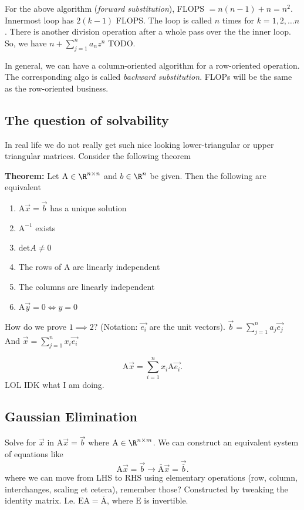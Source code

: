 \documentclass[a4paper]{article}
\begin{document}


For the above algorithm (\emph{forward substitution}), FLOPS $= n(n-1) + n = n^2$.
Innermost loop has $2(k-1)$ FLOPS. The loop is called $n$ times for
$k = 1,2,\ldots n$. There is another division operation after a whole
pass over the the inner loop. So, we have $n + \sum_{j=1}^{n} a_n z^n$ TODO. %

In general, we can have a column-oriented algorithm for a row-oriented
operation. The corresponding algo is called \emph{backward substitution}. 
FLOPs will be the same as the row-oriented business.

\subsection*{The question of solvability}
In real life we do not really get such nice looking lower-triangular
or upper triangular matrices. Consider the following theorem

\textbf{Theorem:} Let $\mathrm A \in \R^{n\times n}$ and $b \in  \R^{n}$ be given. Then the following are equivalent
\begin{enumerate}
	\item $\mathrm A \vec{x}= \vec{b}$ has a unique solution
	\item $\mathrm A^{-1}$ exists
	\item $\text{det} A \neq 0$ 
	\item The rows of $\mathrm A$ are linearly independent
	\item The columns are linearly independent
	\item $\mathrm A\vec{y} = 0 \iff y = 0$
\end{enumerate}
How do we prove $1 \implies 2$? (Notation: $\vec{e_i}$ are the unit vectors).
$\vec{b} = \sum_{j=1}^{n} a_j\vec{e_j}$ And $\vec{x} = \sum_{j=1}^{n} x_i \vec{e_i}$

\[
	\mathrm A \vec{x} = \sum_{i=1}^{n} x_i \mathrm{A}\vec{e_i}
.\] 
LOL IDK what I am doing. %

\subsection*{Gaussian Elimination}
Solve for $\vec{x}$ in $\mathrm A \vec{x} = \vec{b}$ where $\mathrm A \in  \R^{n\times m}$. We can construct an equivalent system of equations
like 
\[
	\mathrm A \vec{x} = \vec{b} \to \mathrm{\overline{A}}\vec{x}
	= \vec{\overline{b}}
.\]
where we can move from LHS to RHS using elementary operations (row,
column, interchanges, scaling et cetera),
remember those? Constructed by tweaking the identity matrix. I.e.
$\mathrm{EA} = \mathrm \overline{A}$, where $\mathrm E$ is invertible.
\end{document}
